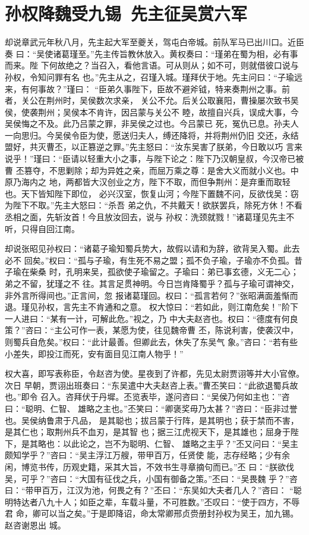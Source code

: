 \chapter{孙权降魏受九锡~先主征吴赏六军}

却说章武元年秋八月，先主起大军至夔关，驾屯白帝城。前队军马已出川口。近臣奏
曰：“吴使诸葛瑾至。”先主传旨教休放入。黄权奏曰：“瑾弟在蜀为相，必有事而来。陛
下何故绝之？当召入，看他言语。可从则从；如不可，则就借彼口说与孙权，令知问罪有名
也。”先主从之，召瑾入城。瑾拜伏于地。先主问曰：“子瑜远来，有何事故？”瑾曰：
“臣弟久事陛下，臣故不避斧钺，特来奏荆州之事。前者，关公在荆州时，吴侯数次求亲，
关公不允。后关公取襄阳，曹操屡次致书吴侯，使袭荆州；吴侯本不肯许，因吕蒙与关公不
睦，故擅自兴兵，误成大事，今吴侯悔之不及。此乃吕蒙之罪，非吴侯之过也。今吕蒙已
死，冤仇已息。孙夫人一向思归。今吴侯令臣为使，愿送归夫人，缚还降将，并将荆州仍旧
交还，永结盟好，共灭曹丕，以正篡逆之罪。”先主怒曰：“汝东吴害了朕弟，今日敢以巧
言来说乎！”瑾曰：“臣请以轻重大小之事，与陛下论之：陛下乃汉朝皇叔，今汉帝已被曹
丕篡夺，不思剿除；却为异姓之亲，而屈万乘之尊：是舍大义而就小义也。中原乃海内之
地，两都皆大汉创业之方，陛下不取，而但争荆州：是弃重而取轻也。天下皆知陛下即位，
必兴汉室，恢复山河；今陛下置魏不问，反欲伐吴：窃为陛下不取。”先主大怒曰：“杀吾
弟之仇，不共戴天！欲朕罢兵，除死方休！不看丞相之面，先斩汝首！今且放汝回去，说与
孙权：洗颈就戮！”诸葛瑾见先主不听，只得自回江南。

却说张昭见孙权曰：“诸葛子瑜知蜀兵势大，故假以请和为辞，欲背吴入蜀。此去必不
回矣。”权曰：“孤与子瑜，有生死不易之盟；孤不负子瑜，子瑜亦不负孤。昔子瑜在柴桑
时，孔明来吴，孤欲使子瑜留之。子瑜曰：弟已事玄德，义无二心；弟之不留，犹瑾之不
往。其言足贯神明。今日岂肯降蜀乎？孤与子瑜可谓神交，非外言所得间也。”正言间，忽
报诸葛瑾回。权曰：“孤言若何？”张昭满面羞惭而退。瑾见孙权，言先主不肯通和之意。
权大惊曰：“若如此，则江南危矣！”阶下一人进曰：“某有一计，可解此危。”视之，乃
中大夫赵咨也。权曰：“德度有何良策？”咨曰：“主公可作一表，某愿为使，往见魏帝曹
丕，陈说利害，使袭汉中，则蜀兵自危矣。”权曰：“此计最善。但卿此去，休失了东吴气
象。”咨曰：“若有些小差失，即投江而死，安有面目见江南人物乎！”

权大喜，即写表称臣，令赵咨为使。星夜到了许都，先见太尉贾诩等并大小官僚。次日
早朝，贾诩出班奏曰：“东吴遣中大夫赵咨上表。”曹丕笑曰：“此欲退蜀兵故也。”即令
召入。咨拜伏于丹墀。丕览表毕，遂问咨曰：“吴侯乃何如主也：”咨曰：“聪明、仁智、
雄略之主也。”丕笑曰：“卿褒奖毋乃太甚？”咨曰：“臣非过誉也。吴侯纳鲁肃于凡品，
是其聪也；拔吕蒙于行阵，是其明也；获于禁而不害，是其仁也；取荆州兵不血刃，是其智
也；据三江虎视天下，是其雄也；屈身于陛下，是其略也：以此论之，岂不为聪明、仁智、
雄略之主乎？”丕又问曰：“吴主颇知学乎？”咨曰：“吴主浮江万艘，带甲百万，任贤使
能，志存经略；少有余闲，博览书传，历观史籍，采其大旨，不效书生寻章摘句而已。”丕
曰：“朕欲伐吴，可乎？”咨曰：“大国有征伐之兵，小国有御备之策。”丕曰：“吴畏魏
乎？”咨曰：“带甲百万，江汉为池，何畏之有？”丕曰：“东吴如大夫者几人？”咨曰：
“聪明特达者八九十人；如臣之辈，车载斗量，不可胜数。”丕叹曰：“使于四方，不辱君
命，卿可以当之矣。”于是即降诏，命太常卿邢贞赍册封孙权为吴王，加九锡。赵咨谢恩出
城。

